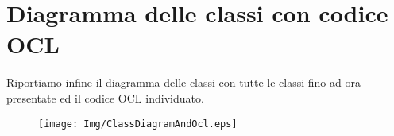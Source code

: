 \chapter{Diagramma delle classi con codice OCL}
Riportiamo infine il diagramma delle classi con tutte le classi fino ad ora presentate ed il codice OCL individuato.

\begin{figure}[ht]
    \centering
    \texttt{[image: Img/ClassDiagramAndOcl.eps]}
\end{figure}